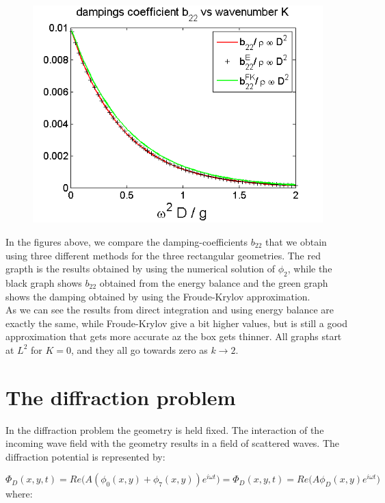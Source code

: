 \documentclass[a4paper,10pt]{article}
\begin{document}
\begin{figure}[H]
  \caption{}\label{add_mass_box2_2}
\endminipage
{}%
  \includegraphics[width=\linewidth]{ad_mass_box3_2.png}
  \caption{}\label{add_mass_box3_2}
\endminipage
\end{figure}

In the figures above, we compare the damping-coefficients $b_{22}$ that we obtain using three different methods for the three rectangular geometries. The red grapth is the results obtained by using the numerical solution of $\phi_2$, while the black graph shows $b_{22}$ obtained from the energy balance and the green graph shows the damping obtained by using the Froude-Krylov approximation.\\
As we can see the results from direct integration and using energy balance are exactly the same, while Froude-Krylov give a bit higher values, but is still a good approximation that gets more accurate az the box gets thinner. All graphs start at $L^2$ for $K=0$, and they all go towards zero as $k \rightarrow 2$.


\section{The diffraction problem}
In the diffraction problem the geometry is held fixed. The interaction of the incoming wave field with the geometry results in a field of scattered waves. The diffraction potential is represented by:

\begin{equation}
\Phi_D(x,y,t) = Re \Big( A (\phi_0(x,y) + \phi_7(x,y) ) e^{i \omega t} \Big) = \Phi_D(x,y,t) = Re \Big( A \phi_D(x,y) e^{i \omega t} \Big) 
\end{equation}
where: 
\end{document}
